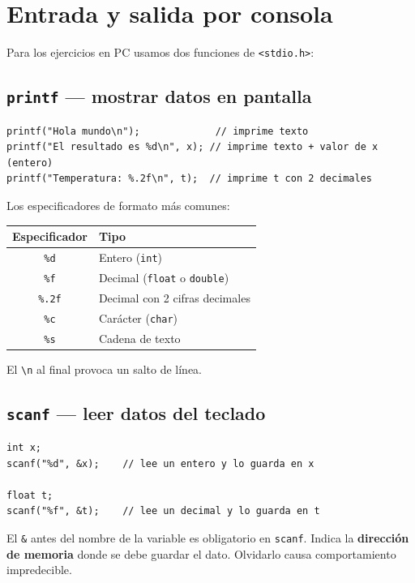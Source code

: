 \section{Entrada y salida por consola}

Para los ejercicios en PC usamos dos funciones de \texttt{<stdio.h>}:

\subsection{\texttt{printf} --- mostrar datos en pantalla}

\begin{lstlisting}[style=estilo-c]
printf("Hola mundo\n");             // imprime texto
printf("El resultado es %d\n", x); // imprime texto + valor de x (entero)
printf("Temperatura: %.2f\n", t);  // imprime t con 2 decimales
\end{lstlisting}

Los especificadores de formato más comunes:

\begin{table}[H]
\centering
\begin{tabular}{cl}
\toprule
Especificador & Tipo \\
\midrule
\texttt{\%d} & Entero (\texttt{int}) \\
\texttt{\%f} & Decimal (\texttt{float} o \texttt{double}) \\
\texttt{\%.2f} & Decimal con 2 cifras decimales \\
\texttt{\%c} & Carácter (\texttt{char}) \\
\texttt{\%s} & Cadena de texto \\
\bottomrule
\end{tabular}
\end{table}

El \texttt{\textbackslash n} al final provoca un salto de línea.

\subsection{\texttt{scanf} --- leer datos del teclado}

\begin{lstlisting}[style=estilo-c]
int x;
scanf("%d", &x);    // lee un entero y lo guarda en x

float t;
scanf("%f", &t);    // lee un decimal y lo guarda en t
\end{lstlisting}

\begin{notabox}
El \texttt{\&} antes del nombre de la variable es obligatorio en \texttt{scanf}. Indica la \textbf{dirección de memoria} donde se debe guardar el dato. Olvidarlo causa comportamiento impredecible.
\end{notabox}

